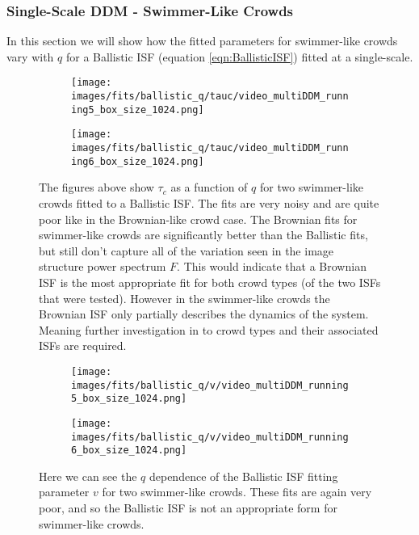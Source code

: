 \documentclass[10pt]{article}
\begin{document}
\subsubsection{Single-Scale DDM - Swimmer-Like Crowds}
In this section we will show how the fitted parameters for swimmer-like crowds vary with $q$ for a Ballistic ISF (equation \ref{eqn:BallisticISF}) fitted at a single-scale.

\begin{figure}[H]
\begin{subfigure}[t]{.5\textwidth}
  \centering
  \texttt{[image: images/fits/ballistic\_q/tauc/video\_multiDDM\_running5\_box\_size\_1024.png]}
  \caption{}
\end{subfigure}%
\hfill
\begin{subfigure}[t]{.5\textwidth}
  \centering
  \texttt{[image: images/fits/ballistic\_q/tauc/video\_multiDDM\_running6\_box\_size\_1024.png]}
  \caption{}
\end{subfigure}
\caption{The figures above show $\tau_c$ as a function of $q$ for two swimmer-like crowds fitted to a Ballistic ISF. The fits are very noisy and are quite poor like in the Brownian-like crowd case. The Brownian fits for swimmer-like crowds are significantly better than the Ballistic fits, but still don't capture all of the variation seen in the image structure power spectrum $F$. This would indicate that a Brownian ISF is the most appropriate fit for both crowd types (of the two ISFs that were tested). However in the swimmer-like crowds the Brownian ISF only partially describes the dynamics of the system. Meaning further investigation in to crowd types and their associated ISFs are required.}
\label{fig:running_ballistic_fits_tauc}
\end{figure}

\begin{figure}[H]
\begin{subfigure}[t]{.5\textwidth}
  \centering
  \texttt{[image: images/fits/ballistic\_q/v/video\_multiDDM\_running5\_box\_size\_1024.png]}
  \caption{}
\end{subfigure}%
\hfill
\begin{subfigure}[t]{.5\textwidth}
  \centering
  \texttt{[image: images/fits/ballistic\_q/v/video\_multiDDM\_running6\_box\_size\_1024.png]}
  \caption{}
\end{subfigure}
\caption{Here we can see the $q$ dependence of the Ballistic ISF fitting parameter $v$ for two swimmer-like crowds. These fits are again very poor, and so the Ballistic ISF is not an appropriate form for swimmer-like crowds.}
\label{fig:running_ballistic_fits_v}
\end{figure}
\end{document}
